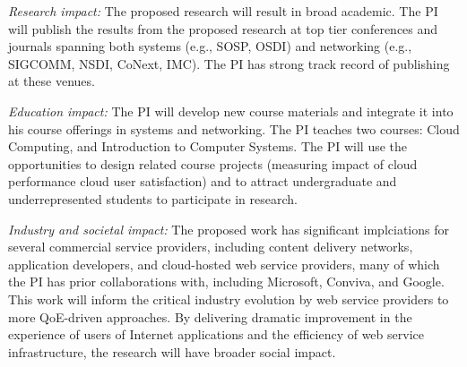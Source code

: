 \begin{packeditemize}
\item {\em Research impact:}
The proposed research will result in broad academic.
The PI will publish the results from the proposed research at top tier conferences and journals spanning both systems (e.g., SOSP, OSDI) and networking (e.g., SIGCOMM, NSDI, CoNext, IMC).
The PI has strong track record of publishing at these venues.

\item {\em Education impact:}
The PI will develop new course materials and integrate it into his course offerings in systems and networking. 
The PI teaches two courses: Cloud Computing, and Introduction to Computer Systems. The PI will use the opportunities to design related course projects (\eg measuring impact of cloud performance cloud user satisfaction) and to attract undergraduate and underrepresented students to participate in research.

\item {\em Industry and societal impact:}
The proposed work has significant implciations for several commercial service providers, including content delivery networks, application developers, and cloud-hosted web service providers, many of which the PI has prior collaborations with, including Microsoft, Conviva, and Google. 
This work will inform the critical industry evolution by  web service providers to more QoE-driven approaches.
By delivering dramatic improvement in the experience of users of Internet applications and the efficiency of web service infrastructure, the research will have broader social impact. 


\end{packeditemize}